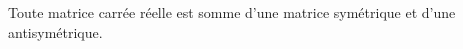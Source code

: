 Toute matrice carrée réelle est somme d'une matrice symétrique et d'une antisymétrique.

\begin{reponses}
\end{reponses}

